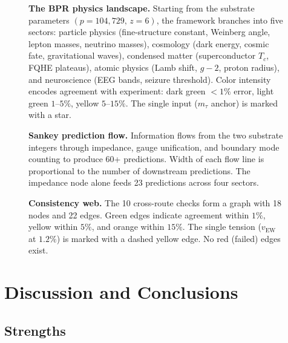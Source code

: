 \documentclass[aps,prd,twocolumn,superscriptaddress,longbibliography,nofootinbib]{revtex4-2}
\newcommand{\vEW}{v_{\mathrm{EW}}}
\begin{document}

\begin{figure}[b]
\caption{\label{fig:landscape}%
\textbf{The BPR physics landscape.}  Starting from the substrate
parameters $(p = 104{,}729,\, z = 6)$, the framework branches into
five sectors: particle physics (fine-structure constant, Weinberg
angle, lepton masses, neutrino masses), cosmology (dark energy,
cosmic fate, gravitational waves), condensed matter (superconductor
$T_c$, FQHE plateaus), atomic physics (Lamb shift, $g-2$, proton
radius), and neuroscience (EEG bands, seizure threshold).  Color
intensity encodes agreement with experiment: dark green $< 1\%$
error, light green $1$--$5\%$, yellow $5$--$15\%$.  The single
input ($m_\tau$ anchor) is marked with a star.}
\end{figure}

\begin{figure}[t]
\caption{\label{fig:sankey}%
\textbf{Sankey prediction flow.}  Information flows from the two
substrate integers through impedance, gauge unification, and
boundary mode counting to produce 60+ predictions.  Width of each
flow line is proportional to the number of downstream predictions.
The impedance node alone feeds 23 predictions across four sectors.}
\end{figure}

\begin{figure}[b]
\caption{\label{fig:consistency}%
\textbf{Consistency web.}  The 10 cross-route checks form a graph
with 18 nodes and 22 edges.  Green edges indicate agreement within
$1\%$, yellow within $5\%$, and orange within $15\%$.  The single
tension ($\vEW$ at $1.2\%$) is marked with a dashed yellow edge.
No red (failed) edges exist.}
\end{figure}


\section{Discussion and Conclusions}
\label{sec:discussion}

\subsection{Strengths}
\end{document}

